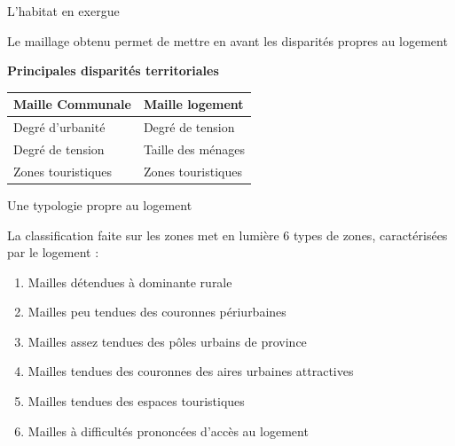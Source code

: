 \documentclass[11pt]{beamer}
\begin{document}
\begin{frame}{L'habitat en exergue}

Le maillage obtenu permet de mettre en avant les disparités propres au logement

\begin{center}
\textbf{Principales disparités territoriales} \\
\vspace{.3cm}

\begin{tabular}{p{4cm} | p{4cm}}
\hline
Maille Communale & Maille logement \\
\hline
Degré d'urbanité & Degré de tension \\
Degré de tension & Taille des ménages \\
Zones touristiques & Zones touristiques \\
\hline

\end{tabular}
\end{center}
\end{frame}

\begin{frame}{Une typologie propre au logement}

La classification faite sur les zones met en lumière 6 types de zones, caractérisées par le logement :
\vspace{.2cm}
\begin{enumerate}
\item Mailles détendues à dominante rurale
\item Mailles peu tendues des couronnes périurbaines
\item Mailles assez tendues des pôles urbains de province
\item Mailles tendues des couronnes des aires urbaines attractives
\item Mailles tendues des espaces touristiques
\item Mailles à difficultés prononcées d'accès au logement
\end{enumerate}
\end{frame}
\end{document}

